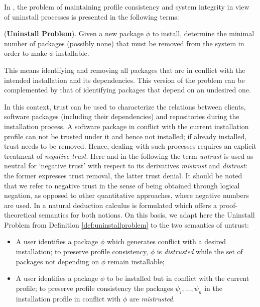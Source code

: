\documentclass[]{llncs}
\begin{document}
%
In \cite{4222580}, the problem of maintaining profile consistency and system integrity in view of uninstall processes is presented in the following terms:

\begin{definition}\label{def:uninstallproblem}
	(\textbf{Uninstall Problem}). Given a new package $\phi$ to install, determine the minimal number of packages (possibly
	none) that must be removed from the system in order to make $\phi$ installable.
\end{definition}
This means identifying and removing all packages that are in conflict with the intended installation and its dependencies. This version of the problem can be complemented by that of identifying packages that depend on an undesired one.

In this context, trust can be used to characterize the relations between clients, software packages (including their dependencies) and repositories during the installation process. A software package in conflict with the current installation profile can not be trusted under it and hence not installed; if already installed, trust needs to be removed. Hence, dealing with such processes requires an explicit treatment of \textit{negative trust}. Here and in the following the term \textit{untrust} is used as neutral for `negative trust' with respect to its derivatives \textit{mistrust} and \textit{distrust}: the former expresses trust removal, the latter trust denial. It should be noted that we refer to negative trust in the sense of being obtained through logical negation, as opposed to other quantitative approaches, where negative numbers are used. In \cite{DBLP:conf/ifiptm/Primiero16} a natural deduction calculus is formulated which offers a proof-theoretical semantics for both notions. On this basis, we adapt here the Uninstall Problem from Definition \ref{def:uninstallproblem} to the two semantics of untrust:


\begin{itemize}
	\item A user identifies a package $\phi$ which generates conflict with a desired installation; to preserve profile consistency, $\phi$ is \textit{distrusted} while the set of  packages not depending on $\phi$ remain installable;
	\item A user identifies a package $\phi$ to be installed but in conflict with the current profile; to preserve profile consistency the packages $\psi_{i}, \dots, \psi_{n}$ in the installation profile  in conflict with $\phi$ are \textit{mistrusted}.
\end{itemize}
\end{document}
